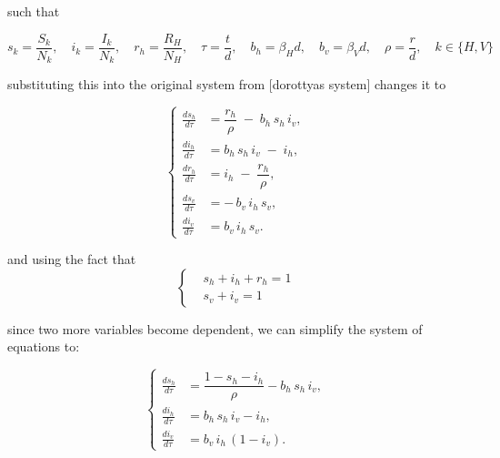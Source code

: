 such that 

\begin{equation}
s_k = \frac{S_k}{N_k}, \quad i_k = \frac{I_k}{N_k}, \quad r_h = \frac{R_H}{N_H}, \quad \tau = \frac{t}{d}, \quad b_h = \beta_H d, \quad b_v = \beta_Vd, \quad \rho = \frac{r}{d}, \quad k \in \{H,V\}    
\end{equation}


substituting this into the original system from [dorottyas system] changes it to 

\begin{equation}
\left\{
\begin{aligned}
\displaystyle
\frac{ds_h}{d\tau} &= \dfrac{r_h}{\rho} \;-\; b_h\,s_h\,i_v,\\[1ex]
\frac{di_h}{d\tau} &= b_h\,s_h\,i_v \;-\; i_h,\\[1ex]
\frac{dr_h}{d\tau} &= i_h \;-\; \dfrac{r_h}{\rho},\\[1ex]
\frac{ds_v}{d\tau} &= -\,b_v\,i_h\,s_v,\\[1ex]
\frac{di_v}{d\tau} &= b_v\,i_h\,s_v.
\end{aligned}
\right.
\end{equation}

and using the fact that
\begin{equation}
\left\{
\begin{aligned}
        &s_h + i_h +r_h = 1 \\
        &s_v + i_v = 1
\end{aligned}
\right.
\end{equation}

since two more variables become dependent, we can simplify the system of equations to: 

\begin{equation}
\left\{
\begin{aligned}
\frac{ds_h}{d\tau}
  &= \dfrac{1 - s_h - i_h}{\rho}
   - b_h\,s_h\,i_v,\\[0.5ex]
\frac{di_h}{d\tau}
  &= b_h\,s_h\,i_v
   - i_h,\\[0.5ex]
\frac{di_v}{d\tau}
  &= b_v\,i_h\,(1 - i_v).
\end{aligned}
\right.
\end{equation}


